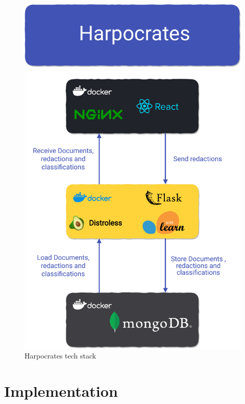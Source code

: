 \documentclass[\version]{l4proj}
\begin{document}
\begin{figure}
    \includegraphics[width=\linewidth]{figures/tech_stack_no_background.pdf}
    \caption{Harpocrates tech stack}\label{fig:tech_stack}
\end{figure}

\chapter{Implementation}


\end{document}
